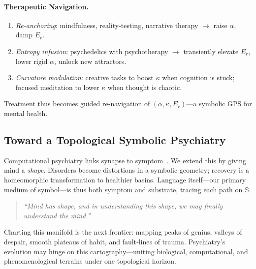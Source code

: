 \paragraph{Therapeutic Navigation.}  
\begin{enumerate}
    \item \textit{Re‑anchoring}: mindfulness, reality‑testing, narrative therapy $\rightarrow$ raise $\alpha$, damp $E_r$.  
    \item \textit{Entropy infusion}: psychedelics with psychotherapy $\rightarrow$ transiently elevate $E_r$, lower rigid $\alpha$, unlock new attractors.  
    \item \textit{Curvature modulation}: creative tasks to boost $\kappa$ when cognition is stuck; focused meditation to lower $\kappa$ when thought is chaotic.  
\end{enumerate}
Treatment thus becomes guided re‑navigation of $(\alpha,\kappa,E_r)$—a symbolic GPS for mental health.

\subsection*{Toward a Topological Symbolic Psychiatry}

Computational psychiatry links synapse to symptom \cite{friston2023compnos}. We extend this by giving mind a \emph{shape}. Disorders become distortions in a symbolic geometry; recovery is a homeomorphic transformation to healthier basins. Language itself—our primary medium of symbol—is thus both symptom and substrate, tracing each path on $\mathbb{S}$.

\begin{quote}
\textit{“Mind has shape, and in understanding this shape, we may finally understand the mind.”}
\end{quote}

Charting this manifold is the next frontier: mapping peaks of genius, valleys of despair, smooth plateaus of habit, and fault‑lines of trauma. Psychiatry’s evolution may hinge on this cartography—uniting biological, computational, and phenomenological terrains under one topological horizon.


